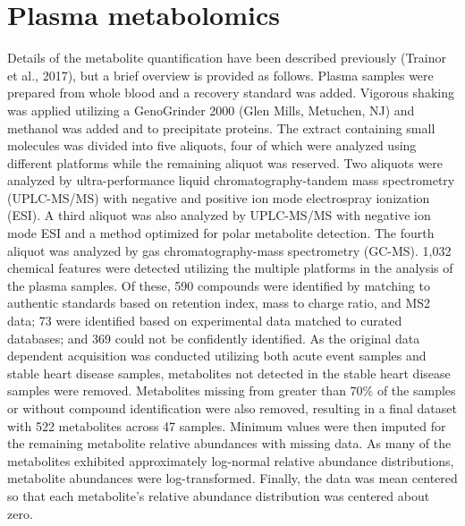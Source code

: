\section{Plasma metabolomics}
Details of the metabolite quantification have been described previously (Trainor et al., 2017), but a brief overview is provided as follows. Plasma samples were prepared from whole blood and a recovery standard was added. Vigorous shaking was applied utilizing a GenoGrinder 2000 (Glen Mills, Metuchen, NJ) and methanol was added and to precipitate proteins. The extract containing small molecules was divided into five aliquots, four of which were analyzed using different platforms while the remaining aliquot was reserved. Two aliquots were analyzed by ultra-performance liquid chromatography-tandem mass spectrometry (UPLC-MS/MS) with negative and positive ion mode electrospray ionization (ESI). A third aliquot was also analyzed by UPLC-MS/MS with negative ion mode ESI and a method optimized for polar metabolite detection. The fourth aliquot was analyzed by gas chromatography-mass spectrometry (GC-MS). 1,032 chemical features  were detected utilizing the multiple platforms in the analysis of the plasma samples. Of these, 590 compounds were identified by matching to authentic standards based on retention index, mass to charge ratio, and MS2 data; 73 were identified based on experimental data matched to curated databases; and 369 could not be confidently identified. As the original data dependent acquisition was conducted utilizing both acute event samples and stable heart disease samples, metabolites not detected in the stable heart disease samples were removed. Metabolites missing from greater than 70\% of the samples or without compound identification were also removed, resulting in a final dataset with 522 metabolites across 47 samples. Minimum values were then imputed for the remaining metabolite relative abundances with missing data. As many of the metabolites exhibited approximately log-normal relative abundance distributions, metabolite abundances were log-transformed. Finally, the data was mean centered so that each metabolite’s relative abundance distribution was centered about zero. 

